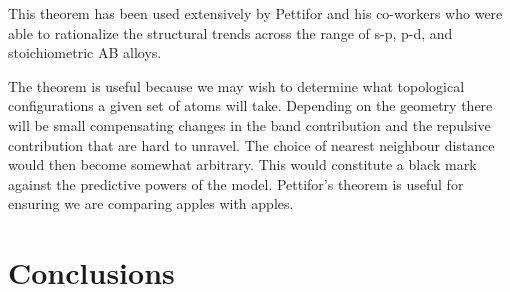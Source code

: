 This theorem has been used extensively by Pettifor and his co-workers who were able to 
rationalize the structural trends across the range of s-p\cite{cressoni91}, p-d\cite{pettifor86b}, 
and stoichiometric AB alloys\cite{bieber81,pettifor86a}.

The theorem is useful because we may wish to determine what topological configurations a given set of atoms
will take. Depending on the geometry there will be small compensating changes in 
the band contribution and the repulsive contribution that are hard to
unravel. The choice of nearest neighbour distance would then become
somewhat arbitrary. This would constitute a black mark against the predictive powers of
the model. Pettifor's theorem is useful for ensuring we are comparing apples with apples.


\section{Conclusions}


